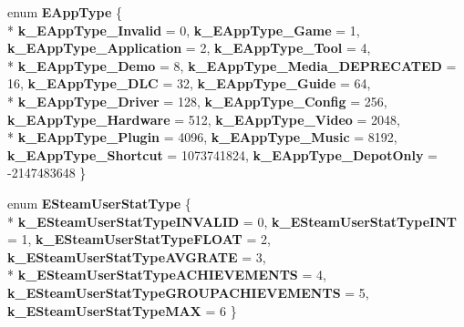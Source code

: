 \begin{DoxyCompactItemize}
\item 
\hypertarget{namespaceValve_1_1Steamworks_a72bce558a41a1351db9b5dfba7600956}{}enum {\bfseries E\+App\+Type} \{ \\*
{\bfseries k\+\_\+\+E\+App\+Type\+\_\+\+Invalid} = 0, 
{\bfseries k\+\_\+\+E\+App\+Type\+\_\+\+Game} = 1, 
{\bfseries k\+\_\+\+E\+App\+Type\+\_\+\+Application} = 2, 
{\bfseries k\+\_\+\+E\+App\+Type\+\_\+\+Tool} = 4, 
\\*
{\bfseries k\+\_\+\+E\+App\+Type\+\_\+\+Demo} = 8, 
{\bfseries k\+\_\+\+E\+App\+Type\+\_\+\+Media\+\_\+\+D\+E\+P\+R\+E\+C\+A\+T\+E\+D} = 16, 
{\bfseries k\+\_\+\+E\+App\+Type\+\_\+\+D\+L\+C} = 32, 
{\bfseries k\+\_\+\+E\+App\+Type\+\_\+\+Guide} = 64, 
\\*
{\bfseries k\+\_\+\+E\+App\+Type\+\_\+\+Driver} = 128, 
{\bfseries k\+\_\+\+E\+App\+Type\+\_\+\+Config} = 256, 
{\bfseries k\+\_\+\+E\+App\+Type\+\_\+\+Hardware} = 512, 
{\bfseries k\+\_\+\+E\+App\+Type\+\_\+\+Video} = 2048, 
\\*
{\bfseries k\+\_\+\+E\+App\+Type\+\_\+\+Plugin} = 4096, 
{\bfseries k\+\_\+\+E\+App\+Type\+\_\+\+Music} = 8192, 
{\bfseries k\+\_\+\+E\+App\+Type\+\_\+\+Shortcut} = 1073741824, 
{\bfseries k\+\_\+\+E\+App\+Type\+\_\+\+Depot\+Only} = -\/2147483648
 \}\label{namespaceValve_1_1Steamworks_a72bce558a41a1351db9b5dfba7600956}

\item 
\hypertarget{namespaceValve_1_1Steamworks_a15b38f5cd07e677a2e5bf2527fb6b562}{}enum {\bfseries E\+Steam\+User\+Stat\+Type} \{ \\*
{\bfseries k\+\_\+\+E\+Steam\+User\+Stat\+Type\+I\+N\+V\+A\+L\+I\+D} = 0, 
{\bfseries k\+\_\+\+E\+Steam\+User\+Stat\+Type\+I\+N\+T} = 1, 
{\bfseries k\+\_\+\+E\+Steam\+User\+Stat\+Type\+F\+L\+O\+A\+T} = 2, 
{\bfseries k\+\_\+\+E\+Steam\+User\+Stat\+Type\+A\+V\+G\+R\+A\+T\+E} = 3, 
\\*
{\bfseries k\+\_\+\+E\+Steam\+User\+Stat\+Type\+A\+C\+H\+I\+E\+V\+E\+M\+E\+N\+T\+S} = 4, 
{\bfseries k\+\_\+\+E\+Steam\+User\+Stat\+Type\+G\+R\+O\+U\+P\+A\+C\+H\+I\+E\+V\+E\+M\+E\+N\+T\+S} = 5, 
{\bfseries k\+\_\+\+E\+Steam\+User\+Stat\+Type\+M\+A\+X} = 6
 \}\label{namespaceValve_1_1Steamworks_a15b38f5cd07e677a2e5bf2527fb6b562}


\end{DoxyCompactItemize}
